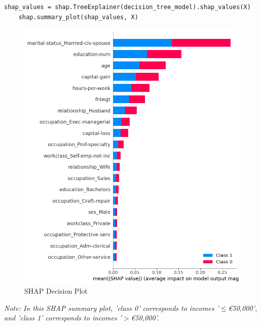 \documentclass[10pt,journal,compsoc]{IEEEtran}
\begin{document}
\begin{lstlisting}[caption=SHAP Explainer , label=shap_explainer]
    shap_values = shap.TreeExplainer(decision_tree_model).shap_values(X)
    shap.summary_plot(shap_values, X)
\end{lstlisting}

\begin{figure}[H]
    \centering
    \includegraphics[width=1\linewidth]{images/shap_summary_plot.png}
    \caption{SHAP Decision Plot}
    \label{fig:shap_explainer}
\end{figure}
\textit{Note: In this SHAP summary plot, 'class 0' corresponds to incomes '$\leq$€50,000', and 'class 1' corresponds to incomes '$>$€50,000'.}
\\
\end{document}
